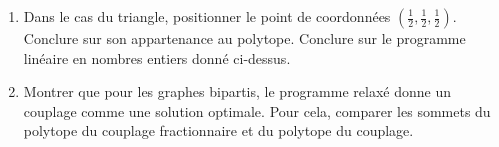 \begin{td-exo}
\begin{enumerate}
\begin{enumerate}
\begin{enumerate}
				\item Si \(G\) est non biparti, alors \(M \neq FM\).
			\end{enumerate}

			\item Dans le cas du triangle, positionner le point de coordonnées \(\left(\frac{1}{2}, \frac{1}{2}, \frac{1}{2}\right)\).
			Conclure sur son appartenance au polytope.
			Conclure sur le programme linéaire en nombres entiers donné ci-dessus.

			\item Montrer que pour les graphes bipartis, le programme relaxé donne un couplage comme une solution optimale.
			Pour cela, comparer les sommets du polytope du couplage fractionnaire et du polytope du couplage.
		\end{enumerate}
	\end{enumerate}
\end{td-exo}

